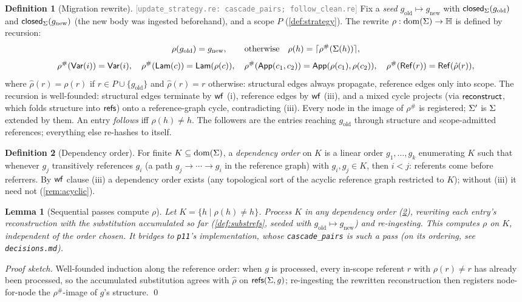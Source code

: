 \documentclass[11pt]{article}
\theoremstyle{definition}
\newtheorem{definition}{Definition}[section]
\theoremstyle{plain}
\newtheorem{lemma}[theorem]{Lemma}
\theoremstyle{remark}
\newcommand{\src}[1]{{\footnotesize\textcolor{gray}{[\texttt{#1}]}}}
\begin{document}
\begin{definition}[Migration rewrite]\label{def:cascade}
\src{update\_strategy.re: cascade\_pairs; follow\_clean.re} Fix a \emph{seed}
$g_{\mathrm{old}} \mapsto g_{\mathrm{new}}$ with $\mathsf{closed}_{\Sigma}(g_{\mathrm{old}})$ and
$\mathsf{closed}_{\Sigma}(g_{\mathrm{new}})$ (the new body was ingested beforehand), and a scope $P$
(\cref{def:strategy}). The rewrite $\rho : \operatorname{dom}(\Sigma) \to \mathbb{H}$ is defined by recursion:
\[
  \rho(g_{\mathrm{old}}) = g_{\mathrm{new}}, \qquad\text{otherwise}\quad
  \rho(h) = \lceil \rho^{\#}(\Sigma(h)) \rceil,
\]
\[
  \rho^{\#}(\mathsf{Var}(i)) = \mathsf{Var}(i), \quad
  \rho^{\#}(\mathsf{Lam}(c)) = \mathsf{Lam}(\rho(c)), \quad
  \rho^{\#}(\mathsf{App}(c_1,c_2)) = \mathsf{App}(\rho(c_1),\rho(c_2)), \quad
  \rho^{\#}(\mathsf{Ref}(r)) = \mathsf{Ref}(\hat\rho(r)),
\]
where $\hat\rho(r) = \rho(r)$ if $r \in P \cup \{g_{\mathrm{old}}\}$ and $\hat\rho(r) = r$
otherwise: structural edges always propagate, reference edges only into scope. The recursion is
well-founded: structural edges terminate by $\mathsf{wf}$ (i), reference edges by $\mathsf{wf}$ (iii), and a
mixed cycle projects (via $\mathsf{reconstruct}$, which folds structure into $\mathsf{refs}$) onto a
reference-graph cycle, contradicting (iii). Every node in the image of $\rho^{\#}$ is
registered; $\Sigma'$ is $\Sigma$ extended by them. An entry \emph{follows} iff
$\rho(h) \neq h$. The followers are the entries reaching $g_{\mathrm{old}}$ through structure
and scope-admitted references; everything else re-hashes to itself.
\end{definition}

\begin{definition}[Dependency order]\label{def:deporder}
For finite $K \subseteq \operatorname{dom}(\Sigma)$, a \emph{dependency order} on $K$ is a linear order
$g_1, \dots, g_k$ enumerating $K$ such that whenever $g_j$ transitively references $g_i$ (a
path $g_j \to \cdots \to g_i$ in the reference graph) with $g_i, g_j \in K$, then $i < j$:
referents come before referrers. By $\mathsf{wf}$ clause (iii) a dependency order exists (any
topological sort of the acyclic reference graph restricted to $K$); without (iii) it need not
(\cref{rem:acyclic}).
\end{definition}

\begin{lemma}[Sequential passes compute $\rho$]\label{lem:cascade-order}
Let $K = \{h \mid \rho(h) \neq h\}$. Process $K$ in any dependency order
(\cref{def:deporder}), rewriting each entry's reconstruction with the substitution accumulated
so far (\cref{def:substrefs}, seeded with $g_{\mathrm{old}} \mapsto g_{\mathrm{new}}$) and
re-ingesting. This computes $\rho$ on $K$, independent of the order chosen. It bridges to
\texttt{p11}'s implementation, whose \texttt{cascade\_pairs} is such a pass (on its ordering,
see \texttt{decisions.md}).
\end{lemma}
\begin{proof}[Proof sketch]
Well-founded induction along the reference order: when $g$ is processed, every in-scope
referent $r$ with $\rho(r) \neq r$ has already been processed, so the accumulated substitution
agrees with $\hat\rho$ on $\mathsf{refs}(\Sigma,g)$; re-ingesting the rewritten reconstruction then
registers node-for-node the $\rho^{\#}$-image of $g$'s structure. \qed
\end{proof}
\end{document}
